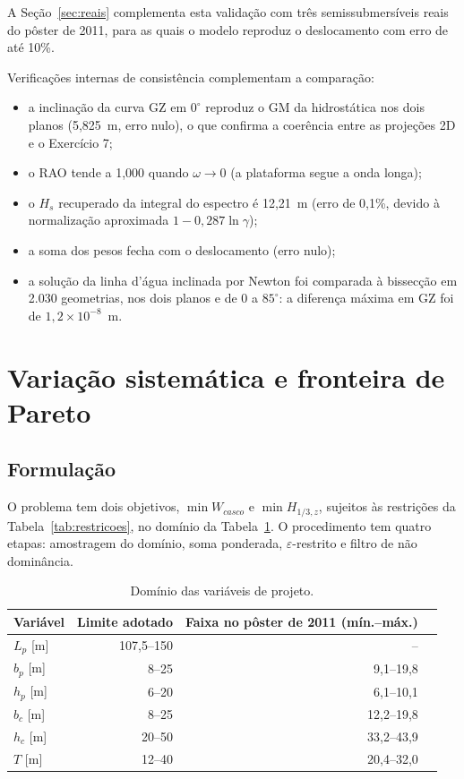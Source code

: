 \documentclass[11pt,a4paper]{article}
\newcommand{\Hz}{H_{1/3,z}}
\begin{document}
A Seção~\ref{sec:reais} complementa esta validação com três semissubmersíveis reais do pôster de
2011, para as quais o modelo reproduz o deslocamento com erro de até 10\%.

Verificações internas de consistência complementam a comparação:
\begin{itemize}
\item a inclinação da curva GZ em $0^\circ$ reproduz o GM da hidrostática nos dois planos
(5,825~m, erro nulo), o que confirma a coerência entre as projeções 2D e o Exercício 7;
\item o RAO tende a 1,000 quando $\omega \to 0$ (a plataforma segue a onda longa);
\item o $H_s$ recuperado da integral do espectro é 12,21~m (erro de 0,1\%, devido à
normalização aproximada $1 - 0{,}287\ln\gamma$);
\item a soma dos pesos fecha com o deslocamento (erro nulo);
\item a solução da linha d'água inclinada por Newton foi comparada à bissecção em 2.030
geometrias, nos dois planos e de 0 a $85^\circ$: a diferença máxima em GZ foi de
$1{,}2\times10^{-8}$~m.
\end{itemize}

\section{Variação sistemática e fronteira de Pareto}\label{sec:otimizacao}

\subsection{Formulação}

O problema tem dois objetivos, $\min W_{casco}$ e $\min \Hz$, sujeitos às restrições da
Tabela~\ref{tab:restricoes}, no domínio da Tabela~\ref{tab:limites}. O procedimento tem quatro
etapas: amostragem do domínio, soma ponderada, $\varepsilon$-restrito e filtro de não
dominância.

\begin{table}[H]
\centering
\caption{Domínio das variáveis de projeto.}\label{tab:limites}
\begin{tabular}{lrrr}
\toprule
Variável & Limite adotado & Faixa no pôster de 2011 (mín.--máx.) \\
\midrule
$L_p$ [m] & 107,5--150 & -- \\
$b_p$ [m] & 8--25 & 9,1--19,8 \\
$h_p$ [m] & 6--20 & 6,1--10,1 \\
$b_c$ [m] & 8--25 & 12,2--19,8 \\
$h_c$ [m] & 20--50 & 33,2--43,9 \\
$T$ [m] & 12--40 & 20,4--32,0 \\
\bottomrule
\end{tabular}
\end{table}
\end{document}
